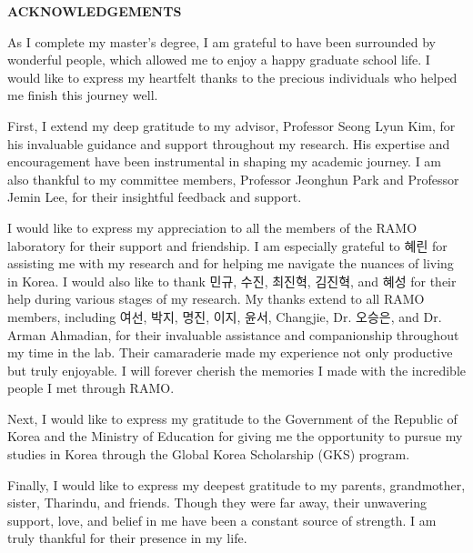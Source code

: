 \clearpage
{}
\begin{centering}
\textbf{ACKNOWLEDGEMENTS}\\
\vspace{\baselineskip}
\end{centering}

As I complete my master’s degree, I am grateful to have been surrounded by wonderful people, which allowed me to enjoy a happy graduate school life. 
I would like to express my heartfelt thanks to the precious individuals who helped me finish this journey well.

First, I extend my deep gratitude to my advisor, Professor Seong Lyun Kim, for his invaluable guidance and support throughout my research. 
His expertise and encouragement have been instrumental in shaping my academic journey. 
I am also thankful to my committee members, Professor Jeonghun Park and Professor Jemin Lee, for their insightful feedback and support.

I would like to express my appreciation to all the members of the RAMO laboratory for their support and friendship. I am especially grateful to
 혜린 for assisting me with my research and for helping me navigate the nuances of living in Korea. I would also like to thank 민규, 수진, 최진혁, 
 김진혁, and 혜성 for their help during various stages of my research. My thanks extend to all RAMO members, including 여선, 박지, 명진, 이지, 윤서, 
 Changjie, Dr. 오승은, and Dr. Arman Ahmadian, for their invaluable assistance and companionship throughout my time in the lab. Their camaraderie 
 made my experience not only productive but truly enjoyable. I will forever cherish the memories I made with the incredible people I met through RAMO.

Next, I would like to express my gratitude to the Government of the Republic of Korea and the Ministry of Education for giving me the opportunity to 
pursue my studies in Korea through the Global Korea Scholarship (GKS) program.

Finally, I would like to express my deepest gratitude to my parents, grandmother, sister, Tharindu, and friends. Though they were far away, their 
unwavering support, love, and belief in me have been a constant source of strength. I am truly thankful for their presence in my life.

\thispagestyle{empty}
\clearpage

